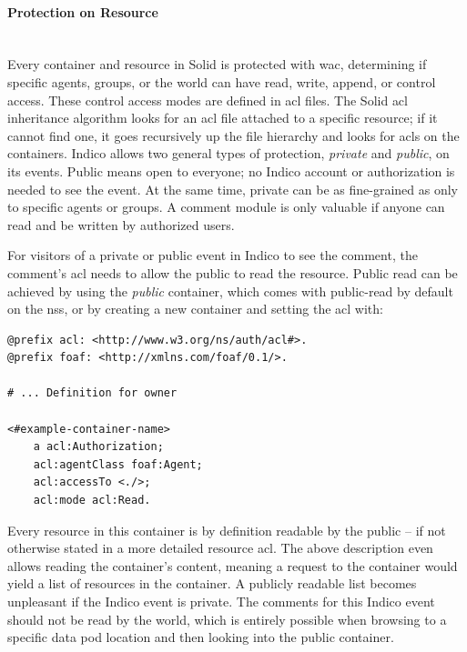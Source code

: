 \vspace{0.5cm}
\paragraph{Protection on Resource}\label{protection-on-resource}\mbox{}\\

Every container and resource in Solid is protected with \gls{wac}, determining if specific agents, groups, or the world can have read, write, append, or control access. These control access modes are defined in \gls{acl} files. The Solid \gls{acl} inheritance algorithm looks for an \gls{acl} file attached to a specific resource; if it cannot find one, it goes recursively up the file hierarchy and looks for \glspl{acl} on the containers.
Indico allows two general types of protection, \textit{private} and \textit{public}, on its events. Public means open to everyone; no Indico account or authorization is needed to see the event. At the same time, private can be as fine-grained as only to specific agents or groups. A comment module is only valuable if anyone can read and be written by authorized users.

For visitors of a private or public event in Indico to see the comment, the comment’s \gls{acl} needs to allow the public to read the resource.  Public read can be achieved by using the \textit{public} container, which comes with public-read by default on the \gls{nss}, or by creating a new container and setting the \gls{acl} with:

\begin{lstlisting}[language=Other,columns=fullflexible, caption={Setting default read for resources in container}, label={lst:container-acl}]
@prefix acl: <http://www.w3.org/ns/auth/acl#>.
@prefix foaf: <http://xmlns.com/foaf/0.1/>.

# ... Definition for owner

<#example-container-name>
    a acl:Authorization;
    acl:agentClass foaf:Agent;
    acl:accessTo <./>;
    acl:mode acl:Read.
\end{lstlisting}

Every resource in this container is by definition readable by the public -- if not otherwise stated in a more detailed resource \gls{acl}. The above description even allows reading the container’s content, meaning a request to the container would yield a list of resources in the container. A publicly readable list becomes unpleasant if the Indico event is private. The comments for this Indico event should not be read by the world, which is entirely possible when browsing to a specific data pod location and then looking into the public container.

